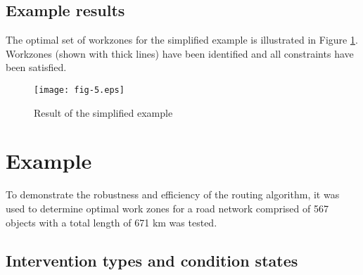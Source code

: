 \documentclass[10pt]{article}
\begin{document}
\subsection{Example results}

The optimal set of workzones for the simplified example is illustrated in Figure
\ref{fig:5}. Workzones (shown with thick lines) have been identified and all
constraints have been satisfied.

\begin{figure}[h]
\begin{center}
\texttt{[image: fig-5.eps]}
\caption{Result of the simplified example}\label{fig:5}
\end{center}
\end{figure}

\section{Example}

To demonstrate the robustness and efficiency of the routing algorithm, it was
used to determine optimal work zones for a road network comprised of 567 objects
with a total length of 671 km was tested.

\subsection{Intervention types and condition states}
\end{document}
